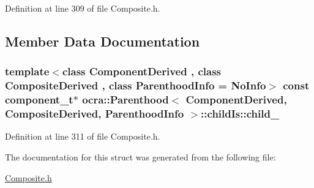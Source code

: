 Definition at line 309 of file Composite.\+h.



\subsection{Member Data Documentation}
\subsubsection[{\texorpdfstring{child\+\_\+}{child_}}]{\setlength{\rightskip}{0pt plus 5cm}template$<$class Component\+Derived , class Composite\+Derived , class Parenthood\+Info  = No\+Info$>$ const {\bf component\+\_\+t}$\ast$ {\bf ocra\+::\+Parenthood}$<$ Component\+Derived, Composite\+Derived, Parenthood\+Info $>$\+::child\+Is\+::child\+\_\+}\hypertarget{structocra_1_1Parenthood_1_1childIs_a6e3329ea395bbb40d41caceecb1587b7}{}\label{structocra_1_1Parenthood_1_1childIs_a6e3329ea395bbb40d41caceecb1587b7}


Definition at line 311 of file Composite.\+h.



The documentation for this struct was generated from the following file\+:\begin{DoxyCompactItemize}
\item 
\hyperlink{Composite_8h}{Composite.\+h}\end{DoxyCompactItemize}

